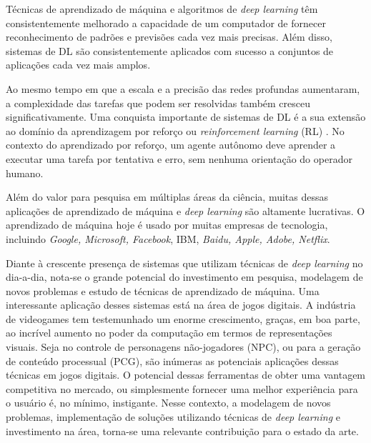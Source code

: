 Técnicas de aprendizado de máquina e algoritmos de \textit{deep learning} têm consistentemente melhorado a capacidade de um computador de fornecer reconhecimento de padrões e previsões cada vez mais precisas. Além disso, sistemas de DL são consistentemente aplicados com sucesso a conjuntos de aplicações cada vez mais amplos.

Ao mesmo tempo em que a escala e a precisão das redes profundas aumentaram, a complexidade das tarefas que podem ser resolvidas também cresceu significativamente. 
Uma conquista importante de sistemas de DL é a sua extensão ao domínio da aprendizagem por reforço ou \textit{reinforcement learning} (RL) \cite{reinforcement-learning-intro-2018}. No contexto do aprendizado por reforço, um agente autônomo deve aprender a executar uma tarefa por tentativa e erro, sem nenhuma orientação do operador humano. 

Além do valor para pesquisa em múltiplas áreas da ciência, muitas dessas aplicações de aprendizado de máquina e \textit{deep learning} são altamente lucrativas. O aprendizado de máquina hoje é usado por muitas empresas de tecnologia, incluindo \textit{Google, Microsoft, Facebook}, IBM, \textit{Baidu, Apple, Adobe, Netflix}.

Diante à crescente presença de sistemas que utilizam técnicas de \textit{deep learning} no dia-a-dia, nota-se o grande potencial do investimento em pesquisa, modelagem de novos problemas e estudo de técnicas de aprendizado de máquina. 
%
Uma interessante aplicação desses sistemas está na área de jogos digitais. A indústria de videogames tem testemunhado um enorme crescimento, graças, em boa parte, ao incrível aumento no poder da computação em termos de representações visuais. 
%
%
Seja no controle de personagens não-jogadores (NPC), ou para a geração de conteúdo processual (PCG), são inúmeras as potenciais aplicações dessas técnicas em jogos digitais.
%
O potencial dessas ferramentas de obter uma vantagem competitiva no mercado, ou simplesmente fornecer uma melhor experiência para o usuário é, no mínimo, instigante.
%
Nesse contexto, a modelagem de novos problemas, implementação de soluções utilizando técnicas de \textit{deep learning} e investimento na área, torna-se uma relevante contribuição para o estado da arte.


